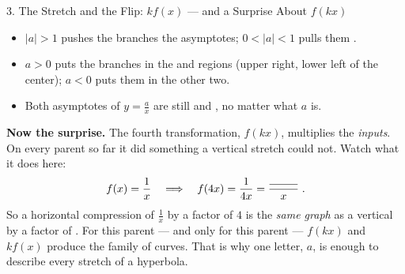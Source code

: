 \documentclass[10pt]{article}
\begin{document}
\begin{notesbox}{3. The Stretch and the Flip: $kf(x)$ --- and a Surprise About $f(kx)$}
\begin{center}
\end{center}
\vspace{2pt}
\begin{itemize}[leftmargin=1.5em, itemsep=2pt]
  \item $|a|>1$ pushes the branches \blank{2.6cm} the asymptotes; \; $0<|a|<1$ pulls them
        \blank{2.6cm}.
  \item $a>0$ puts the branches in the \blank{1.2cm} and \blank{1.2cm} regions (upper right, lower
        left of the center); $a<0$ puts them in the other two.
  \item Both asymptotes of $y=\frac ax$ are still \blank{1.4cm} and \blank{1.4cm}, no matter what
        $a$ is.
\end{itemize}

\vspace{4pt}
\textbf{Now the surprise.} The fourth transformation, $f(kx)$, multiplies the \emph{inputs}. On every
parent so far it did something a vertical stretch could not. Watch what it does here:
\[
  f(x)=\frac1x \quad\Longrightarrow\quad f(4x)=\frac{1}{4x}
  =\frac{\rule{0.9cm}{0.4pt}}{x} \;.
\]
So a horizontal compression of $\frac1x$ by a factor of $4$ is the \emph{same graph} as a vertical
\blank{2.4cm} by a factor of \blank{1.0cm}. For this parent --- and only for this parent ---
$f(kx)$ and $kf(x)$ produce the \blank{2.4cm} family of curves. That is why one letter, $a$, is
enough to describe every stretch of a hyperbola.
\end{notesbox}
\end{document}

